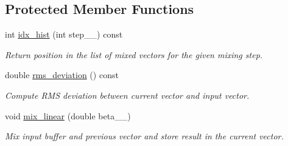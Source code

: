 \subsection*{Protected Member Functions}
\begin{DoxyCompactItemize}
\item 
int \hyperlink{classsirius_1_1_mixer_ab3726b09799f1034259ca259cca98eb1}{idx\+\_\+hist} (int step\+\_\+\+\_\+) const 
\begin{DoxyCompactList}\small\item\em Return position in the list of mixed vectors for the given mixing step. \end{DoxyCompactList}\item 
double \hyperlink{classsirius_1_1_mixer_acb269b79224242b90cbfad05d56f0b7c}{rms\+\_\+deviation} () const 
\begin{DoxyCompactList}\small\item\em Compute R\+M\+S deviation between current vector and input vector. \end{DoxyCompactList}\item 
void \hyperlink{classsirius_1_1_mixer_a0ba707524dfa5f41f85eadf6e9705c77}{mix\+\_\+linear} (double beta\+\_\+\+\_\+)
\begin{DoxyCompactList}\small\item\em Mix input buffer and previous vector and store result in the current vector. \end{DoxyCompactList}\end{DoxyCompactItemize}

